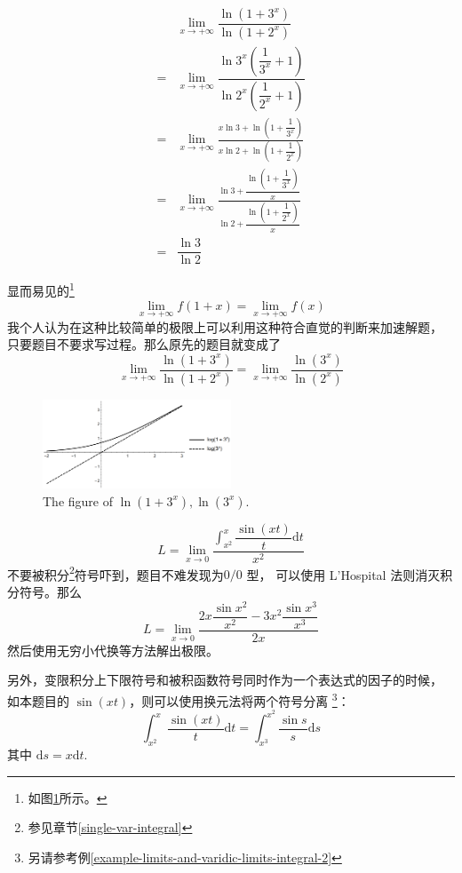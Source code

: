 \begin{example}
    \begin{align*}
         &\lim_{x \to + \infty} \dfrac{\ln (1+3^x)}{\ln (1+2^x)}\\
        =&\lim_{x \to + \infty} \dfrac{\ln 3^x \left(\dfrac{1}{3^x} + 1\right)}{\ln 2^x \left(\dfrac{1}{2^x} + 1\right)}\\
        =&\lim_{x \to + \infty} 
        \frac{
            x\ln 3 + \ln \left(1+\dfrac{1}{3^x}\right)
        }{
            x\ln 2 + \ln \left(1+\dfrac{1}{2^x}\right)
        }\\
        =&\lim_{x \to + \infty} 
        \frac{
            \ln 3 + \dfrac{\ln \left(1+\dfrac{1}{3^x}\right)}{x}
        }{
            \ln 2 + \dfrac{\ln \left(1+\dfrac{1}{2^x}\right)}{x}
        }\\
        =&\dfrac{\ln 3}{\ln 2}
    \end{align*}

    显而易见的\footnote{如图\ref{fig:ln-1-plus-3-to-x-and-its-sibling}所示。}
    \[
        \lim_{x \to +\infty} f(1 + x) = \lim_{x \to +\infty} f(x)
    \]
    我个人认为在这种比较简单的极限上可以利用这种符合直觉的判断来加速解题，
    只要题目不要求写过程。那么原先的题目就变成了
    \[
         \lim_{x \to + \infty} \dfrac{\ln (1+3^x)}{\ln (1+2^x)} = 
         \lim_{x \to + \infty} \dfrac{\ln (3^x)}{\ln (2^x)}
    \]
\end{example}

\begin{figure}
    \centering
    \includegraphics[width=0.5\textwidth]{figure/ln(1plus3tox)-ln(3tox).png}
    \caption{The figure of $\ln(1+3^x), \ln(3^x)$.}
    \label{fig:ln-1-plus-3-to-x-and-its-sibling}
\end{figure}

\begin{example}
    \label{example-limits-and-varidic-limits-integral-1}
    \[
        L = \lim_{x \to 0} 
        \dfrac{\int_{x^2}^{x} \dfrac{\sin (xt)}{t} \mathrm dt }{x^2}
    \]
    不要被积分\footnote{参见章节\ref{single-var-integral}}符号吓到，题目不难发现为$0/0$ 型，
    可以使用 L'Hospital 法则消灭积分符号。那么
    \[
        L = \lim_{x \to 0} \dfrac{2x \dfrac{\sin x^2}{x^2} - 3x^2 \dfrac{\sin x^3}{x^3}}{2x}
    \]
    然后使用无穷小代换等方法解出极限。

    另外，变限积分上下限符号和被积函数符号同时作为一个表达式的因子的时候，
    如本题目的 $\sin (xt)$，则可以使用换元法将两个符号分离
    \footnote{另请参考例\ref{example-limits-and-varidic-limits-integral-2}}：
    \[
        \int_{x^2}^{x}   \dfrac{\sin (xt)}{t}\mathrm dt  = 
        \int_{x^3}^{x^2} \dfrac{\sin s}{s}   \mathrm ds
    \]
    其中 $\mathrm ds = x \mathrm dt$.
\end{example}

